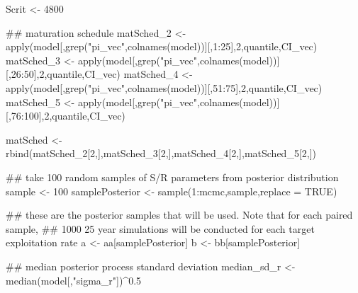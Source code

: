 \documentclass[
  11pt,
]{article}
\newenvironment{Shaded}{}{}
\newcommand{\CommentTok}[1]{\textcolor[rgb]{0.00,0.50,0.00}{#1}}
\newcommand{\DataTypeTok}[1]{#1}
\newcommand{\DecValTok}[1]{#1}
\newcommand{\FloatTok}[1]{#1}
\newcommand{\KeywordTok}[1]{\textcolor[rgb]{0.00,0.00,1.00}{#1}}
\newcommand{\NormalTok}[1]{#1}
\newcommand{\OperatorTok}[1]{#1}
\newcommand{\OtherTok}[1]{\textcolor[rgb]{1.00,0.25,0.00}{#1}}
\newcommand{\StringTok}[1]{\textcolor[rgb]{0.00,0.50,0.50}{#1}}
\begin{document}
\begin{Shaded}
\begin{Highlighting}[]
\NormalTok{Scrit <-}\StringTok{ }\DecValTok{4800}


\CommentTok{## maturation schedule}
\NormalTok{matSched_}\DecValTok{2}\NormalTok{ <-}\StringTok{ }\KeywordTok{apply}\NormalTok{(model[,}\KeywordTok{grep}\NormalTok{(}\StringTok{"pi_vec"}\NormalTok{,}\KeywordTok{colnames}\NormalTok{(model))][,}\DecValTok{1}\OperatorTok{:}\DecValTok{25}\NormalTok{],}\DecValTok{2}\NormalTok{,quantile,CI_vec)}
\NormalTok{matSched_}\DecValTok{3}\NormalTok{ <-}\StringTok{ }\KeywordTok{apply}\NormalTok{(model[,}\KeywordTok{grep}\NormalTok{(}\StringTok{"pi_vec"}\NormalTok{,}\KeywordTok{colnames}\NormalTok{(model))][,}\DecValTok{26}\OperatorTok{:}\DecValTok{50}\NormalTok{],}\DecValTok{2}\NormalTok{,quantile,CI_vec)}
\NormalTok{matSched_}\DecValTok{4}\NormalTok{ <-}\StringTok{ }\KeywordTok{apply}\NormalTok{(model[,}\KeywordTok{grep}\NormalTok{(}\StringTok{"pi_vec"}\NormalTok{,}\KeywordTok{colnames}\NormalTok{(model))][,}\DecValTok{51}\OperatorTok{:}\DecValTok{75}\NormalTok{],}\DecValTok{2}\NormalTok{,quantile,CI_vec)}
\NormalTok{matSched_}\DecValTok{5}\NormalTok{ <-}\StringTok{ }\KeywordTok{apply}\NormalTok{(model[,}\KeywordTok{grep}\NormalTok{(}\StringTok{"pi_vec"}\NormalTok{,}\KeywordTok{colnames}\NormalTok{(model))][,}\DecValTok{76}\OperatorTok{:}\DecValTok{100}\NormalTok{],}\DecValTok{2}\NormalTok{,quantile,CI_vec)}

\NormalTok{matSched <-}\StringTok{ }\KeywordTok{rbind}\NormalTok{(matSched_}\DecValTok{2}\NormalTok{[}\DecValTok{2}\NormalTok{,],matSched_}\DecValTok{3}\NormalTok{[}\DecValTok{2}\NormalTok{,],matSched_}\DecValTok{4}\NormalTok{[}\DecValTok{2}\NormalTok{,],matSched_}\DecValTok{5}\NormalTok{[}\DecValTok{2}\NormalTok{,])}


\CommentTok{## take 100 random samples of S/R parameters from posterior distribution}
\NormalTok{sample <-}\StringTok{ }\DecValTok{100}
\NormalTok{samplePosterior <-}\StringTok{ }\KeywordTok{sample}\NormalTok{(}\DecValTok{1}\OperatorTok{:}\NormalTok{mcmc,sample,}\DataTypeTok{replace =} \OtherTok{TRUE}\NormalTok{)}

\CommentTok{## these are the posterior samples that will be used. Note that for each paired sample,}
\CommentTok{## 1000 25 year simulations will be conducted for each target exploitation rate}
\NormalTok{a <-}\StringTok{ }\NormalTok{aa[samplePosterior]}
\NormalTok{b <-}\StringTok{ }\NormalTok{bb[samplePosterior]}


\CommentTok{## median posterior process standard deviation}
\NormalTok{median_sd_r <-}\KeywordTok{median}\NormalTok{(model[,}\StringTok{"sigma_r"}\NormalTok{])}\OperatorTok{^}\FloatTok{0.5}


\end{Highlighting}
\end{Shaded}
\end{document}
